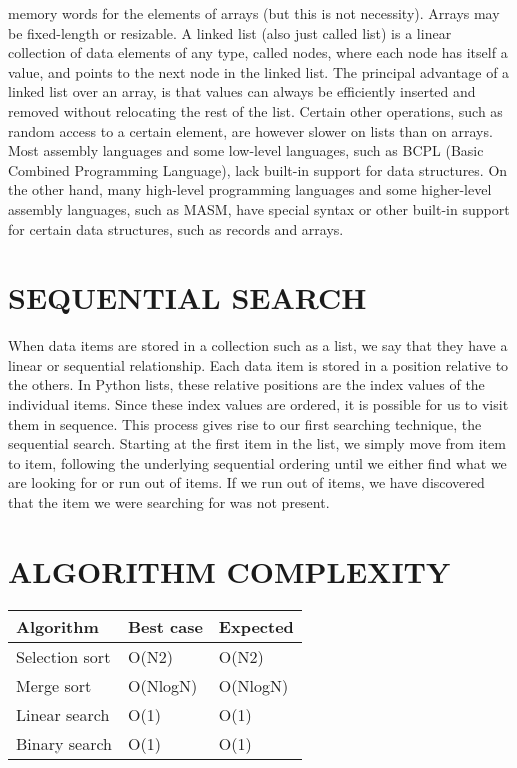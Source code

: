\documentclass{article}
\begin{document}
memory words for the elements of arrays (but this is
not necessity). Arrays may be fixed-length or
resizable. A linked list (also just called list) is a linear
collection of data elements of any type, called nodes,
where each node has itself a value, and points to the
next node in the linked list. The principal advantage
of a linked list over an array, is that values can always
be efficiently inserted and removed without relocating
the rest of the list. Certain other operations, such as
random access to a certain element, are however
slower on lists than on arrays. Most assembly languages and some low-level languages, such as BCPL (Basic Combined Programming Language),
lack built-in support for data structures. On the other
hand, many high-level programming languages and
some higher-level assembly languages, such as
MASM, have special syntax or other built-in support
for certain data structures, such as records and arrays.

\section*{SEQUENTIAL SEARCH}
When data items are stored in a collection such as a
list, we say that they have a linear or sequential
relationship. Each data item is stored in a position
relative to the others. In Python lists, these relative
positions are the index values of the individual items.
Since these index values are ordered, it is possible for
us to visit them in sequence. This process gives rise to
our first searching technique, the sequential search.
Starting at the first item in the list, we simply move
from item to item, following the underlying sequential
ordering until we either find what we are looking for
or run out of items. If we run out of items, we have
discovered that the item we were searching for was
not present.

\begin{table}
\section*{ALGORITHM COMPLEXITY}
\begin{center}
   
    \centering
    \begin{tabular}{ | m{10em} | m{10em}| m{10em} | }
    \hline
         Algorithm & Best case & Expected \\
         \hline
         Selection sort & O(N2) & O(N2)\\
         \hline
         Merge sort & O(NlogN) & O(NlogN)\\
         \hline
         Linear search & O(1) & O(1)\\
         \hline
         Binary search & O(1) & O(1)\\
         \hline
         
         
    \end{tabular}
 
    \label{tab:my_label}
    \end{center}
\end{table}
\end{document}
